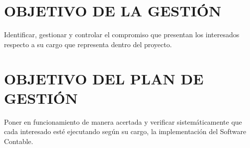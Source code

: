 \chapter{OBJETIVO DE LA GESTI\'ON}
%
Identificar, gestionar y controlar el compromiso que presentan los interesados  respecto a su
cargo que representa dentro del proyecto.

\chapter{OBJETIVO DEL PLAN DE GESTI\'ON}
%
Poner en funcionamiento de manera acertada y verificar sistem\'aticamente que cada interesado
est\'e ejecutando seg\'un  su cargo, la implementaci\'on del Software Contable.%